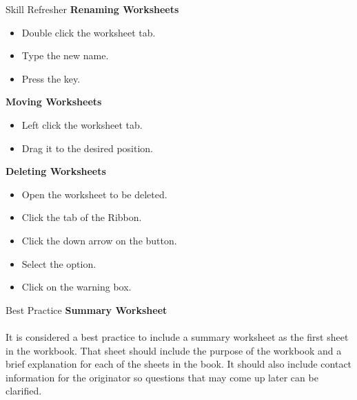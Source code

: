 \begin{center}
	\begin{sklbox}{Skill Refresher}
		\textbf{Renaming Worksheets}
		\\
		\begin{itemize}
			\setlength{\itemsep}{0pt}
			\setlength{\parskip}{0pt}
			\setlength{\parsep}{0pt}
			
			\item Double click the worksheet tab.
			\item Type the new name.
			\item Press the  key.
		\end{itemize}

		\hfill \break
		\textbf{Moving Worksheets}
		\\
		\begin{itemize}
			\setlength{\itemsep}{0pt}
			\setlength{\parskip}{0pt}
			\setlength{\parsep}{0pt}
			
			\item Left click the worksheet tab.
			\item Drag it to the desired position.
		\end{itemize}

		\hfill \break
		\textbf{Deleting Worksheets}
		\\
		\begin{itemize}
			\setlength{\itemsep}{0pt}
			\setlength{\parskip}{0pt}
			\setlength{\parsep}{0pt}
			
			\item Open the worksheet to be deleted.
			\item Click the  tab of the Ribbon.
			\item Click the down arrow on the  button.
			\item Select the  option.
			\item Click  on the warning box.
		\end{itemize}

	\end{sklbox}
\end{center}

\begin{center}
	\begin{infobox}{Best Practice}
		\textbf{Summary Worksheet}
		\\
		\\
		It is considered a best practice to include a summary worksheet as the first sheet in the workbook. That sheet should include the purpose of the workbook and a brief explanation for each of the sheets in the book. It should also include contact information for the originator so questions that may come up later can be clarified.
	\end{infobox}
\end{center}


